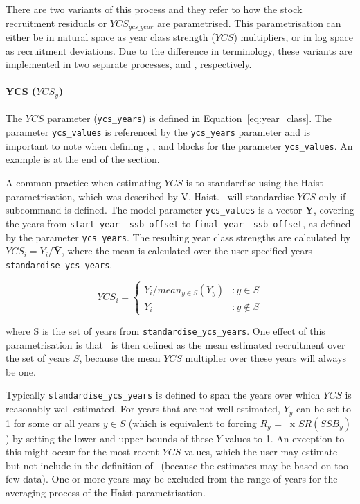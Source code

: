 There are two variants of this process and they refer to how the stock recruitment residuals or $YCS_{ycs\_year}$ are parametrised. This parametrisation can either be in natural space as year class strength ($YCS$) multipliers, or in log space as recruitment deviations. Due to the difference in terminology, these variants are implemented in two separate processes,  and , respectively.

\paragraph*{YCS ($YCS_y$)}

The $YCS$ parameter (\texttt{ycs\_years}) is defined in Equation~\eqref{eq:year_class}. The parameter \texttt{ycs\_values} is referenced by the \texttt{ycs\_years} parameter and is important to note when defining , , and  blocks for the parameter \texttt{ycs\_values}. An example is at the end of the section.

A common practice when estimating $YCS$ is to standardise using the Haist parametrisation, which was described by V. Haist. \CNAME\ will standardise $YCS$ only if subcommand  is defined. The model parameter \texttt{ycs\_values} is a vector \textbf{Y}, covering the years from \texttt{start\_year} - \texttt{ssb\_offset} to \texttt{final\_year} - \texttt{ssb\_offset}, as defined by the parameter \texttt{ycs\_years}. The resulting year class strengths are calculated by $YCS_i=Y_i/\bar{\textbf{Y}}$, where the mean is calculated over the user-specified years \texttt{standardise\_ycs\_years}.

\[
YCS_i =
\begin{cases}
Y_i / mean_{y \in S}(Y_y) & :y \in S\\
Y_i					 & :y \notin S
\end{cases}
\]

where S is the set of years from \texttt{standardise\_ycs\_years}. One effect of this parametrisation is that \Rzero\ is then defined as the mean estimated recruitment over the set of years $S$, because the mean $YCS$ multiplier over these years will always be one.

Typically \texttt{standardise\_ycs\_years} is defined to span the years over which $YCS$ is reasonably well estimated. For years that are not well estimated, $Y_y$ can be set to 1 for some or all years $y\in S$ (which is equivalent to forcing $R_y$ = \Rzero\ x $SR(SSB_y)$) by setting the lower and upper bounds of these $Y$ values to 1. An exception to this might occur for the most recent $YCS$ values, which the user may estimate but not include in the definition of \Rzero\ (because the estimates may be based on too few data). One or more years may be excluded from the range of years for the averaging process of the Haist parametrisation.

